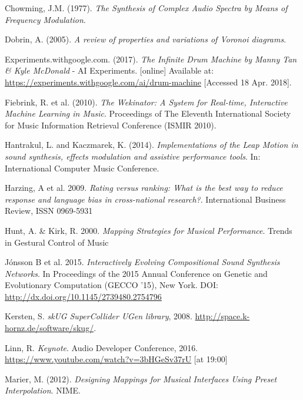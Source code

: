 \documentclass[11pt, oneside]{report}   	%
\begin{document}
{\begin{thebibliography}{9}
Chowming, J.M. (1977). \emph{The Synthesis of Complex Audio Spectra by Means of Frequency Modulation}.

Dobrin, A. (2005). \emph{A review of properties and variations of Voronoi diagrams}. 


Experiments.withgoogle.com. (2017). \emph{The Infinite Drum Machine by Manny Tan \& Kyle McDonald} - AI Experiments. [online] Available at: \url{https://experiments.withgoogle.com/ai/drum-machine} [Accessed 18 Apr. 2018].

Fiebrink, R. et al. (2010). \emph{The Wekinator: A System for Real-time, Interactive Machine Learning in Music}. Proceedings of The Eleventh International Society for Music Information Retrieval Conference (ISMIR 2010). 

Hantrakul, L. and Kaczmarek, K. (2014). \emph{Implementations of the Leap Motion in sound synthesis, effects modulation and assistive performance tools}. In: International Computer Music Conference. 

Harzing, A et al. 2009. \emph{Rating versus ranking: What is the best way to reduce response and language bias in cross-national research?}.
International Business Review,
ISSN 0969-5931

Hunt, A. \& Kirk, R. 2000. \emph{Mapping Strategies for Musical Performance}. Trends in Gestural Control of Music

J\'{o}nsson B et al. 2015. \emph{Interactively Evolving Compositional Sound Synthesis Networks}. In Proceedings of the 2015 Annual Conference on Genetic and Evolutionary Computation (GECCO '15), New York. DOI: \url{http://dx.doi.org/10.1145/2739480.2754796}

Kersten, S. \emph{skUG SuperCollider UGen library}, 2008. \url{http://space.k- hornz.de/software/skug/}.

Linn, R. \emph{Keynote}.  Audio Developer Conference, 2016. \url{https://www.youtube.com/watch?v=3bHGeSv37rU} [at 19:00]

Marier, M. (2012). \emph{Designing Mappings for Musical Interfaces Using Preset Interpolation}. NIME.


\end{thebibliography}}
\end{document}
